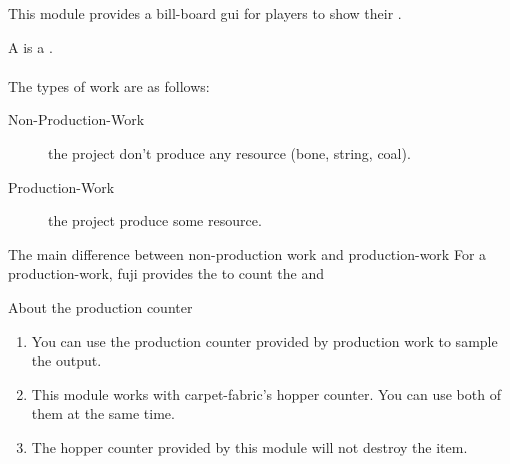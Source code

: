 
This module provides a bill-board gui for players to show their .

A  is a . \\
\\
The types of work are as follows:
\begin{description}
    \item [Non-Production-Work] the project don't produce any resource (\eg bone, string, coal).
    \item[Production-Work] the project produce some resource.
\end{description}

\begin{note}{The main difference between non-production work and production-work}
    For a production-work, fuji provides the  to count the  and 
\end{note}

\begin{tips}{About the production counter}
    \begin{enumerate}
        \item You can use the production counter provided by production work to sample the output.
        \item {This module works with carpet-fabric's hopper counter. You can use both of them at the same time.}
        \item The hopper counter provided by this module will not destroy the item.
    \end{enumerate}

\end{tips}










